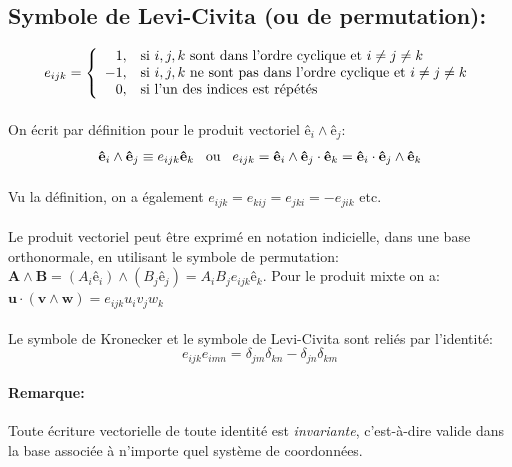 \subsection{Symbole de Levi-Civita (ou de permutation):}
$$e_{ijk}=\left\{
\begin{array}{r l}
	1, & \text{si }i,j,k \text{ sont dans l'ordre cyclique et }i\neq j\neq k\\
	-1, & \text{si }i,j,k \text{ ne sont pas dans l'ordre cyclique et } i\neq j\neq k\\
	0, & \text{si l'un des indices est répétés}
\end{array} \right.$$
\paragraph{}
On écrit par définition pour le produit vectoriel $\textbf{ê}_i\wedge\textbf{ê}_j$: $$\textbf{ê}_i\wedge\textbf{ê}_j\equiv e_{ijk}\textbf{ê}_k\hspace{0.3cm} \text{ou} \hspace{0.3cm} e_{ijk}=\textbf{ê}_i\wedge \textbf{ê}_j \cdot \textbf{ê}_k=\textbf{ê}_i\cdot \textbf{ê}_j \wedge \textbf{ê}_k$$
\paragraph{}
Vu la définition, on a également $e_{ijk} = e_{kij} = e_{jki} = -e_{jik} \text{ etc.}$
\paragraph{}Le produit vectoriel peut être exprimé en notation indicielle, dans une base orthonormale, en utilisant le symbole de permutation: $\textbf{A}\wedge\textbf{B}=(A_i\textbf{ê}_i)\wedge(B_j\textbf{ê}_j) = A_iB_je_{ijk}\textbf{ê}_k$. Pour le produit mixte on a: $\textbf{u}\cdot(\textbf{v}\wedge\textbf{w})=e_{ijk}u_iv_jw_k$
\paragraph{} Le symbole de Kronecker et le symbole de Levi-Civita sont reliés par l'identité:
$$e_{ijk}e_{imn}=\delta_{jm}\delta_{kn}-\delta_{jn}\delta_{km}$$

\paragraph{Remarque:} Toute écriture vectorielle de toute identité est \emph{invariante}, c'est-à-dire valide dans la base associée à n'importe quel système de coordonnées.

